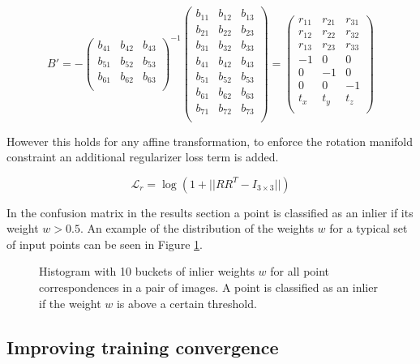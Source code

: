 \[
B'=
-
\begin{pmatrix}
b_{41} & b_{42} & b_{43} \\
b_{51} & b_{52} & b_{53} \\
b_{61} & b_{62} & b_{63} \\
\end{pmatrix}^{-1}
\begin{pmatrix}
b_{11} & b_{12} & b_{13} \\
b_{21} & b_{22} & b_{23} \\
b_{31} & b_{32} & b_{33} \\
b_{41} & b_{42} & b_{43} \\
b_{51} & b_{52} & b_{53} \\
b_{61} & b_{62} & b_{63} \\
b_{71} & b_{72} & b_{73} \\
\end{pmatrix}
=
\begin{pmatrix}
r_{11} & r_{21} & r_{31} \\
r_{12} & r_{22} & r_{32} \\
r_{13} & r_{23} & r_{33} \\
-1 & 0 & 0 \\
0 & -1 & 0 \\
0 & 0 & -1 \\
t_x & t_y & t_z \\
\end{pmatrix}
\]

However this holds for any affine transformation, to enforce the rotation manifold constraint an additional regularizer loss term is added.

\[
\mathcal{L}_r=\log(1 + || RR^T - I_{3\times3} ||)
\]

In the confusion matrix in the results section a point is classified as an inlier if its weight $w>0.5$. An example of the distribution of the weights $w$ for a typical set of input points can be seen in Figure \ref{fig:w-hist}.


\begin{figure}[H]
	\begin{center}
		
	\end{center}
	\caption{Histogram with 10 buckets of inlier weights $w$ for all point correspondences in a pair of images. A point is classified as an inlier if the weight $w$ is above a certain threshold.}
	\label{fig:w-hist}
\end{figure}

\subsection{Improving training convergence}

